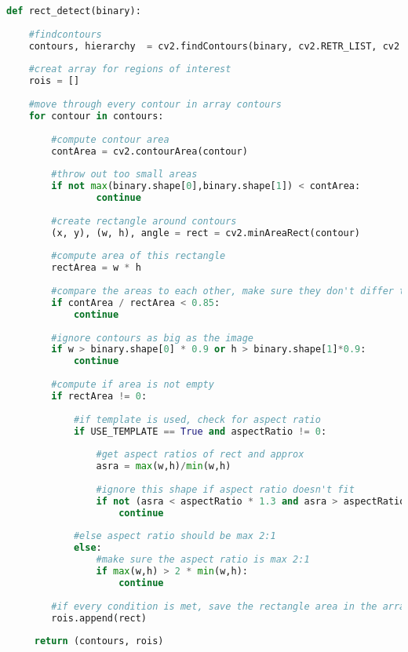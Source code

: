 \begin{lstlisting}[language=Python]        
def rect_detect(binary):
        
    #findcontours
    contours, hierarchy  = cv2.findContours(binary, cv2.RETR_LIST, cv2.CHAIN_APPROX_SIMPLE)
        
    #creat array for regions of interest
    rois = []
        
    #move through every contour in array contours
    for contour in contours:
            
        #compute contour area
        contArea = cv2.contourArea(contour)
          
        #throw out too small areas
        if not max(binary.shape[0],binary.shape[1]) < contArea:
                continue            
            
        #create rectangle around contours
        (x, y), (w, h), angle = rect = cv2.minAreaRect(contour)
            
        #compute area of this rectangle
        rectArea = w * h
            
        #compare the areas to each other, make sure they don't differ too much
        if contArea / rectArea < 0.85:
            continue
            
        #ignore contours as big as the image
        if w > binary.shape[0] * 0.9 or h > binary.shape[1]*0.9:
            continue
            
        #compute if area is not empty
        if rectArea != 0:
               
            #if template is used, check for aspect ratio
            if USE_TEMPLATE == True and aspectRatio != 0:
                    
                #get aspect ratios of rect and approx
                asra = max(w,h)/min(w,h)
                   
                #ignore this shape if aspect ratio doesn't fit
                if not (asra < aspectRatio * 1.3 and asra > aspectRatio *0.7):
                    continue                 
                
            #else aspect ratio should be max 2:1
            else:
                #make sure the aspect ratio is max 2:1
                if max(w,h) > 2 * min(w,h):
                    continue
                
        #if every condition is met, save the rectangle area in the array
        rois.append(rect)
        
     return (contours, rois)
\end{lstlisting}

